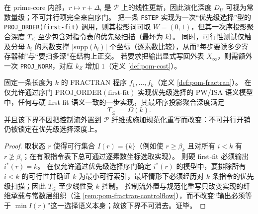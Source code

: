 

\begin{remark}\label{rem:pom-fractran-cost}
在 prime-core 内部，\(r\mapsto r+\Delta_i\) 是 \(\mathcal{P}\) 上的线性更新，因此演化深度 \(D_U\) 可视为常数量级；不可并行项完全来自序门。
把一条 \texttt{FSTEP} 实现为一次“优先级选择”型的 \texttt{PROJ\_ORDER(first-fit)} 调用，则其投影词可取 \(W=(0,1)\)，但其一次序投影聚合深度 \(T_{\le}\) 至少包含对指令表的优先级扫描（最坏为 \(k\)）。
同时，可行性测试仅触及分母 \(b_i\) 的素数支撑 \(|\mathrm{supp}(b_i)|\) 个坐标（逐素数比较），从而“每步要读多少寄存器轴”与“要扫多深”在结构上正交。
若要求把输出显式写回外表 \(X_\infty\)，则需额外一次 \texttt{PROJ\_NORM}，对应 \(k_Z\) 增加 \(1\)（定义 \ref{def:pom-cost}）。
\end{remark}

\begin{proposition}\label{prop:pom-fractran-firstfit-serial-depth}
固定一条长度为 \(k\) 的 FRACTRAN 程序 \(f_1,\dots,f_k\)（定义 \ref{def:pom-fractran}）。
在仅允许通过序门 \(\mathrm{PROJ\_ORDER}(\text{first-fit})\) 实现优先级选择的 PW/ISA 语义模型中，任何与硬 first-fit 语义一致的一步实现，其最坏序投影聚合深度满足
\[
T_{\le}\ =\ \Omega(k).
\]
并且该下界不因把控制流外置到 \(\mathcal{P}\) 纤维或施加规范化重写而改变：不可并行开销仍被锁定在优先级选择深度上。
\end{proposition}
\begin{proof}
取状态 \(r\) 使得可行集合 \(I(r)=\{k\}\)（例如使 \(r\ge \beta_k\) 且对所有 \(i<k\) 有 \(r\not\ge \beta_i\)；在有限指令表下总可通过逐素数坐标选取实现）。
则硬 first-fit 必须输出 \(i^\ast(r)=k\)。
在仅允许通过优先级选择序门确定 \(i^\ast(r)\) 的模型中，要排除所有 \(i<k\) 的可行性并确证 \(k\) 为最小可行索引，最坏情形下必须经历对 \(k\) 条指令的优先级扫描；因此 \(T_{\le}\) 至少线性受 \(k\) 控制。
控制流外置与规范化重写只改变实现的纤维承载与常数层组织（注 \ref{rem:pom-fractran-controlflow}），而不改变“输出必须等于 \(\min I(r)\)”这一选择语义本身；故该下界不可消去。证毕。
\end{proof}

